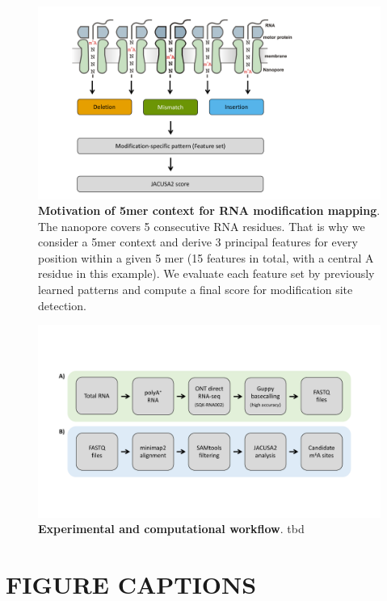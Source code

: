 \documentclass[times, 11pt, a4paper]{article}
\begin{document}
\begin{figure}[h!]
    \includegraphics[width = 1\textwidth]{Figure2.pdf}
  \caption{\textbf{Motivation of 5mer context for RNA modification mapping}. The nanopore covers 5 consecutive RNA residues. That is why we consider a 5mer context and derive 3 principal features for every position within a given 5 mer (15 features in total, with a central A residue in this example). We evaluate each feature set by previously learned patterns and compute a final score for modification site detection.}
  \label{fig:5mer}
      \end{figure}
\newpage

\begin{figure}[h!]
    \includegraphics[width = 1\textwidth]{Figure3.pdf}
  \caption{\textbf{Experimental and computational workflow}. tbd}
  \label{fig:workflow}
      \end{figure}
\newpage

\newpage

\section*{FIGURE CAPTIONS}
\end{document}
